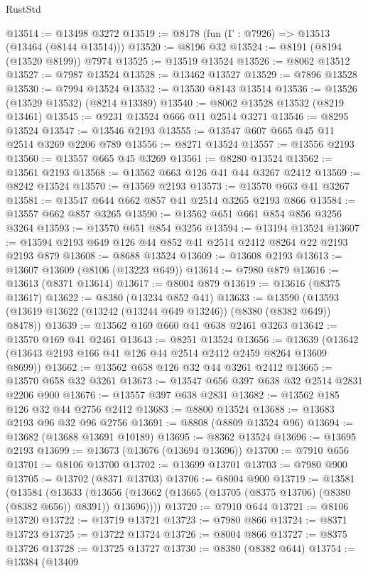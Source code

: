 \begin{lexlean}{RustStd}
\begin{coremodule}
@13514 := @13498 @3272
@13519 := @8178 (fun (Γ : @7926) => @13513 (@13464 (@8144 @13514)))
@13520 := @8196 @32
@13524 := @8191 (@8194 (@13520 @8199)) @7974
@13525 := @13519 @13524
@13526 := @8062 @13512
@13527 := @7987 @13524
@13528 := @13462 @13527
@13529 := @7896 @13528
@13530 := @7994 @13524
@13532 := @13530 @8143 @13514
@13536 := @13526 (@13529 @13532) (@8214 @13389)
@13540 := @8062 @13528 @13532 (@8219 @13461)
@13545 := @9231 @13524 @666 @11 @2514 @3271
@13546 := @8295 @13524
@13547 := @13546 @2193
@13555 := @13547 @607 @665 @45 @11 @2514 @3269 @2206 @789
@13556 := @8271 @13524
@13557 := @13556 @2193
@13560 := @13557 @665 @45 @3269
@13561 := @8280 @13524
@13562 := @13561 @2193
@13568 := @13562 @663 @126 @41 @44 @3267 @2412
@13569 := @8242 @13524
@13570 := @13569 @2193
@13573 := @13570 @663 @41 @3267
@13581 := @13547 @644 @662 @857 @41 @2514 @3265 @2193 @866
@13584 := @13557 @662 @857 @3265
@13590 := @13562 @651 @661 @854 @856 @3256 @3264
@13593 := @13570 @651 @854 @3256
@13594 := @13194 @13524
@13607 := @13594 @2193 @649 @126 @44 @852 @41 @2514 @2412 @8264 @22 @2193 @2193 @879
@13608 := @8688 @13524
@13609 := @13608 @2193
@13613 := @13607 @13609 (@8106 (@13223 @649))
@13614 := @7980 @879
@13616 := @13613 (@8371 @13614)
@13617 := @8004 @879
@13619 := @13616 (@8375 @13617)
@13622 := @8380 (@13234 @852 @41)
@13633 := @13590 (@13593 (@13619 @13622 (@13242 (@13244 @649 @13246)) (@8380 (@8382 @649)) @8478))
@13639 := @13562 @169 @660 @41 @638 @2461 @3263
@13642 := @13570 @169 @41 @2461
@13643 := @8251 @13524
@13656 := @13639 (@13642 (@13643 @2193 @166 @41 @126 @44 @2514 @2412 @2459 @8264 @13609 @8699))
@13662 := @13562 @658 @126 @32 @44 @3261 @2412
@13665 := @13570 @658 @32 @3261
@13673 := @13547 @656 @397 @638 @32 @2514 @2831 @2206 @900
@13676 := @13557 @397 @638 @2831
@13682 := @13562 @185 @126 @32 @44 @2756 @2412
@13683 := @8800 @13524
@13688 := @13683 @2193 @96 @32 @96 @2756
@13691 := @8808 (@8809 @13524 @96)
@13694 := @13682 (@13688 @13691 @10189)
@13695 := @8362 @13524
@13696 := @13695 @2193
@13699 := @13673 (@13676 (@13694 @13696))
@13700 := @7910 @656
@13701 := @8106 @13700
@13702 := @13699 @13701
@13703 := @7980 @900
@13705 := @13702 (@8371 @13703)
@13706 := @8004 @900
@13719 := @13581
    (@13584
      (@13633 (@13656 (@13662 (@13665 (@13705 (@8375 @13706) (@8380 (@8382 @656)) @8391)) @13696))))
@13720 := @7910 @644
@13721 := @8106 @13720
@13722 := @13719 @13721
@13723 := @7980 @866
@13724 := @8371 @13723
@13725 := @13722 @13724
@13726 := @8004 @866
@13727 := @8375 @13726
@13728 := @13725 @13727
@13730 := @8380 (@8382 @644)
@13754 := @13384
    (@13409

\end{coremodule}
\end{lexlean}

